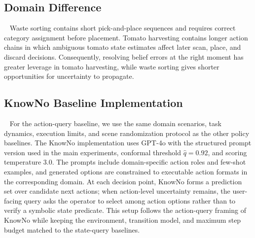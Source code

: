 \subsection{Domain Difference}~\label{appx:domain_difference}
Waste sorting contains short pick-and-place sequences and requires correct category assignment before placement. Tomato harvesting contains longer action chains in which ambiguous tomato state estimates affect later scan, place, and discard decisions. Consequently, resolving belief errors at the right moment has greater leverage in tomato harvesting, while waste sorting gives shorter opportunities for uncertainty to propagate.

\subsection{KnowNo Baseline Implementation}~\label{appx:knowno_impl}
For the action-query baseline, we use the same domain scenarios, task dynamics, execution limits, and scene randomization protocol as the other policy baselines. The KnowNo implementation uses GPT-4o with the structured prompt version used in the main experiments, conformal threshold $\hat{q}=0.92$, and scoring temperature $3.0$. The prompts include domain-specific action roles and few-shot examples, and generated options are constrained to executable action formats in the corresponding domain. At each decision point, KnowNo forms a prediction set over candidate next actions; when action-level uncertainty remains, the user-facing query asks the operator to select among action options rather than to verify a symbolic state predicate. This setup follows the action-query framing of KnowNo while keeping the environment, transition model, and maximum step budget matched to the state-query baselines.
